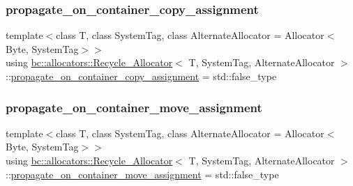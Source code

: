 \subsubsection{\texorpdfstring{propagate\+\_\+on\+\_\+container\+\_\+copy\+\_\+assignment}{propagate\_on\_container\_copy\_assignment}}
{\footnotesize\ttfamily template$<$class T, class System\+Tag, class Alternate\+Allocator = Allocator$<$\+Byte, System\+Tag$>$$>$ \\
using \hyperlink{structbc_1_1allocators_1_1Recycle__Allocator}{bc\+::allocators\+::\+Recycle\+\_\+\+Allocator}$<$ T, System\+Tag, Alternate\+Allocator $>$\+::\hyperlink{structbc_1_1allocators_1_1Recycle__Allocator_a7b02963c13d9f948b1d3895f8631e711}{propagate\+\_\+on\+\_\+container\+\_\+copy\+\_\+assignment} =  std\+::false\+\_\+type}

\mbox{\label{structbc_1_1allocators_1_1Recycle__Allocator_afa6ff49406bf1a2f2000d7353d2a4bb6}} 
\subsubsection{\texorpdfstring{propagate\+\_\+on\+\_\+container\+\_\+move\+\_\+assignment}{propagate\_on\_container\_move\_assignment}}
{\footnotesize\ttfamily template$<$class T, class System\+Tag, class Alternate\+Allocator = Allocator$<$\+Byte, System\+Tag$>$$>$ \\
using \hyperlink{structbc_1_1allocators_1_1Recycle__Allocator}{bc\+::allocators\+::\+Recycle\+\_\+\+Allocator}$<$ T, System\+Tag, Alternate\+Allocator $>$\+::\hyperlink{structbc_1_1allocators_1_1Recycle__Allocator_afa6ff49406bf1a2f2000d7353d2a4bb6}{propagate\+\_\+on\+\_\+container\+\_\+move\+\_\+assignment} =  std\+::false\+\_\+type}

\mbox{\label{structbc_1_1allocators_1_1Recycle__Allocator_afda64ab9ab1d07149055d69505a3cbd0}} 
